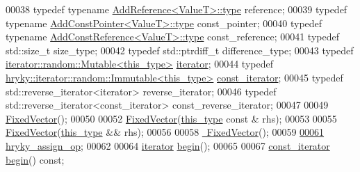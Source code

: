 \begin{DoxyCode}
00038     \textcolor{keyword}{typedef} \textcolor{keyword}{typename} \hyperlink{classhryky_1_1_add_reference_a4b90c1381625432ba6152b7388bc4399}{AddReference<ValueT>::type}             reference;
00039     \textcolor{keyword}{typedef} \textcolor{keyword}{typename} \hyperlink{classhryky_1_1_add_const_pointer_a62e5c44fefac145f6bd2460e4c8d0ba2}{AddConstPointer<ValueT>::type}          const\_pointer;
00040     \textcolor{keyword}{typedef} \textcolor{keyword}{typename} \hyperlink{classhryky_1_1_add_const_reference_aa26e39e87462673d865c90e6a9798b5a}{AddConstReference<ValueT>::type}        const\_reference;
00041     \textcolor{keyword}{typedef} std::size\_t                                     size\_type;
00042     \textcolor{keyword}{typedef} std::ptrdiff\_t                                  difference\_type;
00043     \textcolor{keyword}{typedef} \hyperlink{classhryky_1_1iterator_1_1random_1_1_mutable}{iterator::random::Mutable<this_type>}            \hyperlink{classhryky_1_1iterator_1_1random_1_1_mutable}{iterator};
00044     \textcolor{keyword}{typedef} \hyperlink{classhryky_1_1iterator_1_1random_1_1_immutable}{hryky::iterator::random::Immutable<this_type>}   \hyperlink{classhryky_1_1iterator_1_1random_1_1_immutable}{const_iterator};
00045     \textcolor{keyword}{typedef} std::reverse\_iterator<iterator>                 reverse\_iterator;
00046     \textcolor{keyword}{typedef} std::reverse\_iterator<const\_iterator>           
      const\_reverse\_iterator;
00047 
00049     \hyperlink{classhryky_1_1_fixed_vector_a5d232c24602527464caa5aa8f6a83554}{FixedVector}();
00050 
00052     \hyperlink{classhryky_1_1_fixed_vector_a5d232c24602527464caa5aa8f6a83554}{FixedVector}(\hyperlink{classhryky_1_1_fixed_vector}{this_type} \textcolor{keyword}{const} & rhs);
00053 
00055     \hyperlink{classhryky_1_1_fixed_vector_a5d232c24602527464caa5aa8f6a83554}{FixedVector}(\hyperlink{classhryky_1_1_fixed_vector}{this_type} && rhs);
00056 
00058     \hyperlink{classhryky_1_1_fixed_vector_a690537d2311ebad8ee5d89acbef71800}{~FixedVector}();
00059 
\hypertarget{fixed__vector_8h_source_l00061}{}\hyperlink{classhryky_1_1_fixed_vector_af947c2e7555ca1fa5718f78fafa6b985}{00061}     \hyperlink{classhryky_1_1_fixed_vector_af947c2e7555ca1fa5718f78fafa6b985}{hryky_assign_op};
00062 
00064     \hyperlink{classhryky_1_1iterator_1_1random_1_1_mutable}{iterator} \hyperlink{classhryky_1_1_fixed_vector_ad90451d97fc185f8df9621dff03bbce8}{begin}();
00065 
00067     \hyperlink{classhryky_1_1iterator_1_1random_1_1_immutable}{const_iterator} \hyperlink{classhryky_1_1_fixed_vector_ad90451d97fc185f8df9621dff03bbce8}{begin}() \textcolor{keyword}{const};

\end{DoxyCode}
